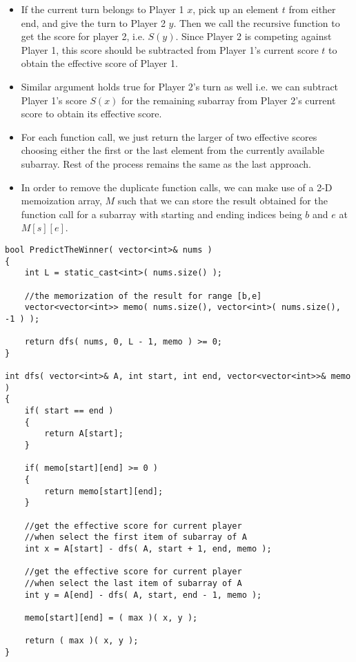 \begin{itemize}
\item If the current turn belongs to Player 1 $x$, pick up an element $t$ from either end, and give the turn to Player 2 $y$. Then we call the recursive function to get the score for player 2, i.e. $S(y)$. Since Player 2 is competing against Player 1, this score should be subtracted from Player 1's current score $t$ to obtain the effective score of Player 1.

\item Similar argument holds true for Player 2's turn as well i.e. we can subtract Player 1's score $S(x)$ for the remaining subarray from Player 2's current score to obtain its effective score. 

\item For each function call, we just return the larger of two effective scores choosing either the first or the last element from the currently available subarray. Rest of the process remains the same as the last approach.

\item In order to remove the duplicate function calls, we can make use of a 2-D memoization array, $M$ such that we can store the result obtained for the function call for a subarray with starting and ending indices being $b$ and $e$ at $M[s][e]$.
\end{itemize}

\setcounter{lstlisting}{0}
\begin{lstlisting}[style=customc, caption={Recursive With Memorization}]
bool PredictTheWinner( vector<int>& nums )
{
    int L = static_cast<int>( nums.size() );

    //the memorization of the result for range [b,e]
    vector<vector<int>> memo( nums.size(), vector<int>( nums.size(), -1 ) );

    return dfs( nums, 0, L - 1, memo ) >= 0;
}

int dfs( vector<int>& A, int start, int end, vector<vector<int>>& memo )
{
    if( start == end )
    {
        return A[start];
    }

    if( memo[start][end] >= 0 )
    {
        return memo[start][end];
    }

    //get the effective score for current player
    //when select the first item of subarray of A
    int x = A[start] - dfs( A, start + 1, end, memo );

    //get the effective score for current player
    //when select the last item of subarray of A
    int y = A[end] - dfs( A, start, end - 1, memo );

    memo[start][end] = ( max )( x, y );

    return ( max )( x, y );
}

\end{lstlisting}

